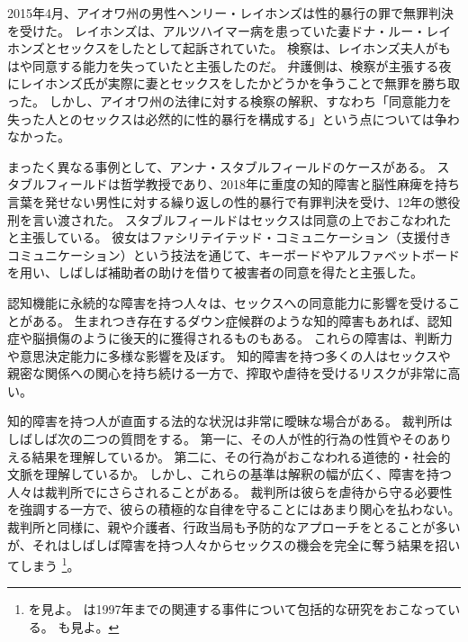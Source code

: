 \documentclass[paper=a4,book,openany]{jlreq}
\begin{document}
2015年4月、アイオワ州の男性ヘンリー・レイホンズは性的暴行の罪で無罪判決を受けた。
レイホンズは、アルツハイマー病を患っていた妻ドナ・ルー・レイホンズとセックスをしたとして起訴されていた。
検察は、レイホンズ夫人がもはや同意する能力を失っていたと主張したのだ。
弁護側は、検察が主張する夜にレイホンズ氏が実際に妻とセックスをしたかどうかを争うことで無罪を勝ち取った。
しかし、アイオワ州の法律に対する検察の解釈、すなわち「同意能力を失った人とのセックスは必然的に性的暴行を構成する」という点については争わなかった\citep{belluck15:_sex_demen_husban_trial_age}。

まったく異なる事例として、アンナ・スタブルフィールドのケースがある。
スタブルフィールドは哲学教授であり、2018年に重度の知的障害と脳性麻痺を持ち言葉を発せない男性に対する繰り返しの性的暴行で有罪判決を受け、12年の懲役刑を言い渡された。
スタブルフィールドはセックスは同意の上でおこなわれたと主張している。
彼女はファシリテイテッド・コミュニケーション（支援付きコミュニケーション）という技法を通じて、キーボードやアルファベットボードを用い、しばしば補助者の助けを借りて被害者の同意を得たと主張した\citep{engber15:_stran_case_anna_stubb}。

認知機能に永続的な障害を持つ人々は、セックスへの同意能力に影響を受けることがある。
生まれつき存在するダウン症候群のような知的障害もあれば、認知症や脳損傷のように後天的に獲得されるものもある。
これらの障害は、判断力や意思決定能力に多様な影響を及ぼす。
知的障害を持つ多くの人はセックスや親密な関係への関心を持ち続ける一方で、搾取や虐待を受けるリスクが非常に高い\citep{justice16:_crime_person_disab}。

知的障害を持つ人が直面する法的な状況は非常に曖昧な場合がある。
裁判所はしばしば次の二つの質問をする。
第一に、その人が性的行為の性質やそのありえる結果を理解しているか。
第二に、その行為がおこなわれる道徳的・社会的文脈を理解しているか。
しかし、これらの基準は解釈の幅が広く、障害を持つ人々は裁判所でにさらされることがある。
裁判所は彼らを虐待から守る必要性を強調する一方で、彼らの積極的な自律を守ることにはあまり関心を払わない。
裁判所と同様に、親や介護者、行政当局も予防的なアプローチをとることが多いが、それはしばしば障害を持つ人々からセックスの機会を完全に奪う結果を招いてしまう\nocite{appel10:_sex_right_disab} \footnote{\citet{appel10:_sex_right_disab}を見よ。
\citet{denno97:_sexual_rape_mental_retar}は1997年までの関連する事件について包括的な研究をおこなっている。
\citet[p.86]{kulick15:_lonel_its_oppos}も見よ。
}。
\end{document}
